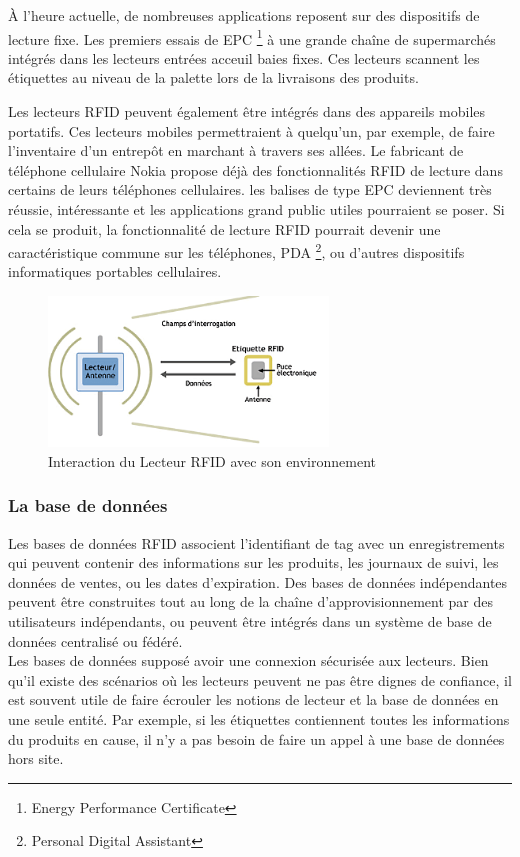 \documentclass[11pt, a4paper, twoside]{book}
\begin{document}
À l'heure actuelle, de nombreuses applications reposent sur des dispositifs de lecture fixe. Les premiers essais de EPC  \footnote{Energy Performance Certificate}  à une grande chaîne de supermarchés intégrés dans les lecteurs entrées acceuil baies fixes. Ces lecteurs scannent les étiquettes au niveau de la palette lors de la livraisons des produits. 

Les lecteurs RFID peuvent également être intégrés dans des appareils mobiles portatifs. Ces lecteurs mobiles permettraient à quelqu'un, par exemple, de faire l'inventaire d'un entrepôt en marchant à travers ses allées. Le fabricant de téléphone cellulaire Nokia propose déjà des fonctionnalités RFID de lecture dans certains de leurs téléphones cellulaires. les balises de type EPC deviennent très réussie, intéressante et les applications grand public utiles pourraient se poser. Si cela se produit, la fonctionnalité de lecture RFID pourrait devenir une caractéristique commune sur les téléphones, PDA \footnote{Personal Digital Assistant}, ou d'autres dispositifs informatiques portables cellulaires.
\begin{figure}[H]
\centering
\includegraphics[height=4cm]{reader}
\caption{Interaction du Lecteur RFID avec son environnement}
\end{figure}
\subsubsection{La base de données}
Les bases de données RFID associent l'identifiant de tag avec un enregistrements qui peuvent contenir des informations sur les produits, les journaux de suivi, les données de ventes, ou les dates d'expiration. Des bases de données indépendantes peuvent être construites tout au long de la chaîne d'approvisionnement par des utilisateurs indépendants, ou peuvent être intégrés dans un système de base de données centralisé ou fédéré.\\

Les bases de données supposé avoir une connexion sécurisée aux lecteurs. Bien qu'il existe des scénarios où les lecteurs peuvent ne pas être dignes de confiance, il est souvent utile de faire écrouler les notions de lecteur et la base de données en une seule entité. Par exemple, si les étiquettes contiennent toutes les informations du produits en cause, il n'y a pas besoin de faire un appel à une base de données hors site.\\
\end{document}
